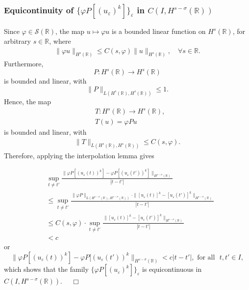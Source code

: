 \documentclass{beamer}
\newcommand{\nin}{\noindent}
\newcommand{\rr}{\mathbb{R}}
\newcommand{\ee}{\varepsilon}
\newcommand{\vp}{\varphi}
\begin{document}
%
\vskip0.1in
\nin
\begin{frame}
\frametitle{Equicontinuity of $\{ \varphi P [(u_\ee)^k]\}_\ee$  in $C(I,
H^{s-\sigma}(\rr))$}
%
%
Since $\varphi \in \mathcal{S}(\rr)$, the map $u \mapsto \vp u$
is a bounded linear function on $H^s(\rr)$, for arbitrary $s \in
\rr$, where  
\begin{equation}
\begin{split}
\|\varphi u\|_{H^s(\rr)} \le C(s, \varphi)
\|u\|_{H^s(\rr)}, \quad \forall s\in \rr.
\label{hhschwartz-estimate}
\end{split}
\end{equation}
Furthermore, $$P: H^s(\rr) \to H^s(\rr)$$ is bounded and linear,
with 
\begin{equation}
\label{operator-normaa}
\|P\|_{L(H^s(\rr), H^s(\rr))} \le 1.
\end{equation}
Hence, the map 
\begin{equation}
\label{the-map}
\begin{split}
& T: H^s(\rr) \to H^s(\rr),
\\
& T(u) = \vp P u 
\end{split}
\end{equation}
is bounded and linear, with 
\begin{equation}
\begin{split}
\|T\|_{L(H^s(\rr), H^s(\rr))} \le C(s, \vp).
\label{op-norm-product}
\end{split}
\end{equation}
Therefore, applying the interpolation lemma
gives 
\end{frame}
\begin{frame}
%
\begin{equation*}
\begin{split}
\label{hhequic-1}
& \sup_{t \neq t'} \frac {\| \varphi P [(u_\ee(t))^k] - \varphi
P [(u_\ee(t'))^k] \|_{H^{s -
\sigma  }(\rr)}}{|t - t'|}
\\
& \le \sup_{t \neq t'}  \frac { \|\vp P \|_{L(H^{s-\sigma}(\rr),
H^{s-\sigma}(\rr))} \cdot \|   [u_\ee(t)]^k  - 
[u_\ee(t')]^k \|_{H^{s -
\sigma }(\rr)}}{|t - t'|}
\\
& \le C(s, \vp) \cdot \sup_{t \neq t'}  \frac { \|   [u_\ee(t)]^k  - 
[u_\ee(t')]^k \|_{H^{s -
\sigma }(\rr)}}{|t - t'|}
\\
&< c
\end{split}
\end{equation*}
%
or
%
\begin{equation*}
\label{hhequic-2}
\|\varphi P [(u_\ee(t))^k] - \varphi
P [(u_\ee(t'))^k \|_{H^{s - \sigma }(\rr)}< c|t -
t'|, 
\text{ for all }  \,\,  t, t'\in I,
\end{equation*}
%
which shows that  the family  $\{\varphi P [(u_\ee)^k]\}_\ee$ is
equicontinuous in $C(I, H^{s-\sigma }(\rr))$.  $\quad \Box$
%
\vskip0.1in
\nin
%
%
%
%
%
%
%
%
%
%		
\end{frame}
\end{document}
